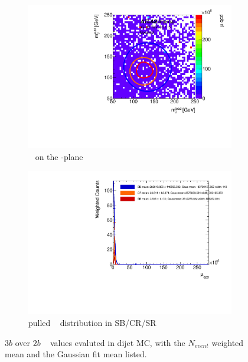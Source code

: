 \begin{figure}[htbp!]
\centering
\captionsetup{justification=centering}
	\hspace{-1cm}
    \begin{subfigure}[b]{0.4\textwidth}
        \includegraphics[width=\textwidth,angle=-90]{figures/boosted/AppendixMuqcdstudy/QCD_ThreeTag_Incl_mH0H1.pdf}
        \caption{\muqcd~ on the \mleadJ-\msublJ plane}
        \label{fig:app-muqcd-3b-2d-qcd}
    \end{subfigure}
    \quad \quad \quad \quad 
    \begin{subfigure}[b]{0.4\textwidth}
        \includegraphics[width=\textwidth,angle=-90]{figures/boosted/AppendixMuqcdstudy/QCD_ThreeTag_Incl_mH0H1_pull.pdf}
        \caption{pulled \muqcd~ distribution in SB/CR/SR}
        \label{fig:app-muqcd-3b-pull-qcd}
    \end{subfigure}
\caption{$3b$ over $2b$ \muqcd~ values evaluted in dijet MC, with the $N_{event}$ weighted mean and the Gaussian fit mean listed.}
\label{fig:app-muqcd-3b-qcd}
\end{figure}


